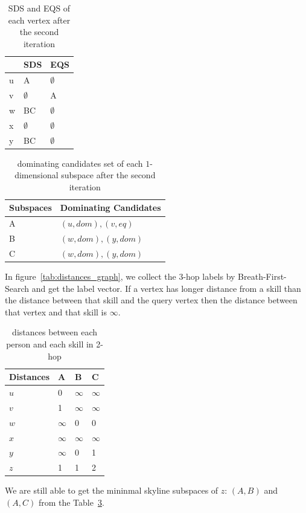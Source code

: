 \begin{table}[h]
    \centering

    \begin{tabular}{|l|l|l|}
    \hline
      & SDS         & EQS         \\ \hline
    u & A           & $\emptyset$ \\ \hline
    v & $\emptyset$ & A           \\ \hline
    w & BC          & $\emptyset$ \\ \hline
    x & $\emptyset$ & $\emptyset$ \\ \hline
    y & BC          & $\emptyset$ \\ \hline
    \end{tabular}
    \caption{\label{font-table}SDS and EQS of each vertex after the second iteration}
\end{table}

\begin{table}[h]
    \centering

    \begin{tabular}{|l|l|}
    \hline
    Subspaces & Dominating Candidates \\ \hline
    A         & $(u, dom), (v, eq)$            \\ \hline
    B         & $(w, dom), (y, dom)$            \\ \hline
    C         & $(w, dom), (y, dom)$            \\ \hline
    \end{tabular}
    \caption{\label{font-table}dominating candidates set of each $1$-dimensional subspace after the second iteration}
\end{table}






In figure~\ref{tab:distances_graph}, we collect the $3$-hop labels by Breath-First-Search and get the label vector. If a vertex has longer distance from a skill than the distance between that skill and the query vertex then the distance between that vertex and that skill is $\infty$.
\begin{table}[h]
    \centering
    \begin{tabular}{llll}
    \hline
    Distances & A & B & C \\ \hline
    $u$       & 0 & $\infty$ & $\infty$ \\ \hline
    $v$       & 1 & $\infty$ & $\infty$ \\ \hline
    $w$       & $\infty$ & 0 & 0 \\ \hline
    $x$       & $\infty$ & $\infty$ & $\infty$ \\ \hline
    $y$       & $\infty$ & 0 & 1 \\ \hline
    $z$       & 1 & 1 & 2 \\ \hline
    \end{tabular}
    \caption{\label{font-table} distances between each person and each skill in 2-hop}
    \label{tab:d_hops_distance}
\end{table}
We are still able to get the mininmal skyline subspaces of $z$: $(A, B)$ and $(A, C)$ from the Table~\ref{tab:d_hops_distance}.


